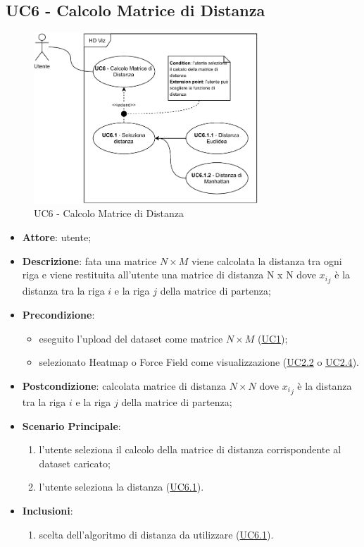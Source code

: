 \subsection{UC6 - Calcolo Matrice di Distanza}
\label{uc6}

    \begin{figure}[htbp]
        \centering
        \includegraphics[width=0.75\textwidth]{source/sections/casi-uso/diagrams/uc6.pdf}
        \caption{UC6 - Calcolo Matrice di Distanza}
        \label{fig:uc6}
    \end{figure}
    
    \begin{itemize}
    \item \textbf{Attore}: utente;
    \item \textbf{Descrizione}: fata una matrice $N \times M$ viene calcolata la distanza tra ogni riga e viene restituita all'utente una matrice di distanza N x N dove ${x_i}_j$ è la distanza tra la riga $i$ e la riga $j$ della matrice di partenza;
    \item \textbf{Precondizione}: 
    \begin{itemize}
        \item eseguito l'upload del dataset come matrice $N\times M$ (\hyperref[uc1]{UC1});
        \item selezionato Heatmap o Force Field come visualizzazione (\hyperref[uc2.2]{UC2.2} o \hyperref[uc2.4]{UC2.4}).
    \end{itemize}  
    \item \textbf{Postcondizione}: calcolata matrice di distanza $N \times N$ dove ${x_i}_j$ è la distanza tra la riga $i$ e la riga $j$ della matrice di partenza;
    \item \textbf{Scenario Principale}: 
    \begin{enumerate}
        \item l'utente seleziona il calcolo della matrice di distanza corrispondente al dataset caricato;
        \item l'utente seleziona la distanza (\hyperref[uc6.1]{UC6.1}).
    \end{enumerate}  
    \item \textbf{Inclusioni}:
        \begin{enumerate}
            \item scelta dell'algoritmo di distanza da utilizzare (\hyperref[uc6.1]{UC6.1}).
        \end{enumerate} 
    \end{itemize}
    
